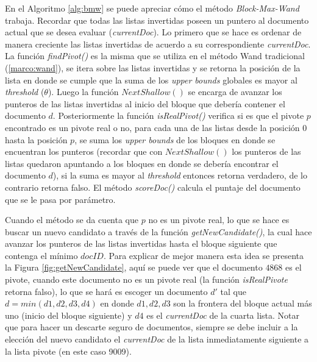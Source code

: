 En el Algoritmo \ref{alg:bmw} se puede apreciar cómo el método \textit{Block-Max-Wand} trabaja. Recordar que todas las listas invertidas poseen un puntero al documento actual que se desea evaluar (\textit{currentDoc}). Lo primero que se hace es ordenar de manera creciente las listas invertidas de acuerdo a su correspondiente \textit{currentDoc}. La función \textit{findPivot()} es la misma que se utiliza en el método Wand tradicional (\ref{marco:wand}), se itera sobre las listas invertidas y se retorna la posición de la lista en donde se cumple que la suma de los \textit{upper bounds} globales es mayor al \textit{threshold} ($\theta$). Luego la función \textit{$NextShallow()$} se encarga de avanzar los punteros de las listas invertidas al inicio del bloque que debería contener el documento $d$. Posteriormente la función \textit{isRealPivot()} verifica si es que el pivote $p$ encontrado es un pivote real o no, para cada una de las listas desde la posición $0$ hasta la posición $p$, se suma los \textit{upper bounds} de los bloques en donde se encuentran los punteros (recordar que con \textit{$NextShallow()$} los punteros de las listas quedaron apuntando a los bloques en donde se debería encontrar el documento $d$), si la suma es mayor al \textit{threshold} entonces retorna verdadero, de lo contrario retorna falso. El método \textit{scoreDoc()} calcula el puntaje del documento que se le pasa por parámetro. 

Cuando el método se da cuenta que $p$ no es un pivote real, lo que se hace es buscar un nuevo candidato a través de la función \textit{getNewCandidate()}, la cual hace avanzar los punteros de las listas invertidas hasta el bloque siguiente que contenga el mínimo $docID$. Para explicar de mejor manera esta idea se presenta la Figura \ref{fig:getNewCandidate}, aquí se puede ver que el documento $4868$ es el pivote, cuando este documento no es un pivote real (la función \textit{isRealPivote} retorna falso), lo que se hará es escoger un documento $d'$ tal que $d = min(d1,d2,d3,d4)$ en donde $d1,d2,d3$ son la frontera del bloque actual más uno (inicio del bloque siguiente) y $d4$ es el \textit{currentDoc} de la cuarta lista. Notar que para hacer un descarte seguro de documentos, siempre se debe incluir a la elección del nuevo candidato el \textit{currentDoc} de la lista inmediatamente siguiente a la lista pivote (en este caso 9009).  


